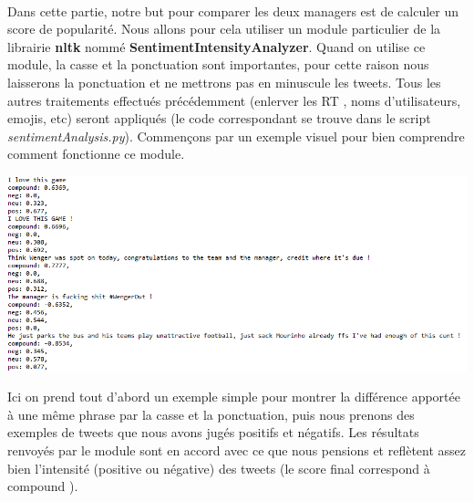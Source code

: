 \documentclass[14pt, openany]{article}
\begin{document}
\paragraph{}
Dans cette partie, notre but pour comparer les deux managers est de calculer un score de popularité. Nous allons pour cela utiliser un module particulier de la librairie \textbf{nltk} nommé \textbf{SentimentIntensityAnalyzer}. Quand on utilise ce module, la casse et la ponctuation sont importantes, pour cette raison nous laisserons la ponctuation et ne mettrons pas en minuscule les tweets. Tous les autres traitements effectués précédemment (enlerver les \og RT \fg{}, noms d'utilisateurs, emojis, etc) seront appliqués (le code correspondant se trouve dans le script \textit{sentimentAnalysis.py}). Commençons par un exemple visuel pour bien comprendre comment fonctionne ce module.
\begin{center}
\includegraphics[scale=0.8]{Images/senti_ana.png}
\end{center}
Ici on prend tout d'abord un exemple simple pour montrer la différence apportée à une même phrase par la casse et la ponctuation, puis nous prenons des exemples de tweets que nous avons jugés positifs et négatifs. Les résultats renvoyés par le module sont en accord avec ce que nous pensions et reflètent assez bien l'intensité (positive ou négative) des tweets (le score final correspond à \og compound \fg{}).
\end{document}
